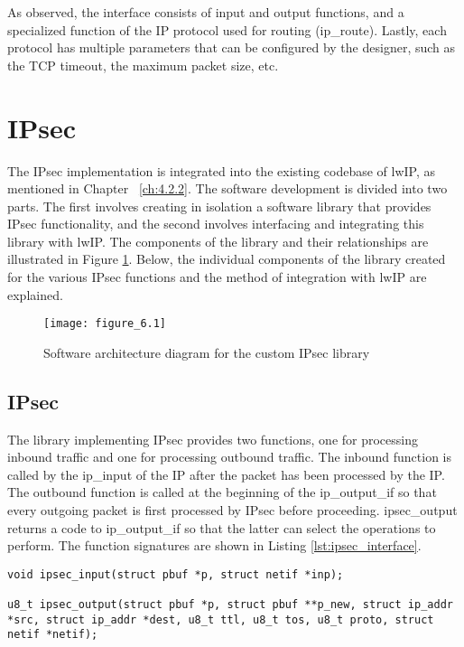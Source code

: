 As observed, the interface consists of input and output functions, and a specialized function of the IP protocol used for routing (ip\_route).
Lastly, each protocol has multiple parameters that can be configured by the designer, such as the TCP timeout, the maximum packet size, etc.

\section{IPsec}
The IPsec implementation is integrated into the existing codebase of lwIP, as mentioned in Chapter ~\ref{ch:4.2.2}. The software development is divided into two parts. The first involves creating in isolation a software library that provides IPsec functionality, and the second involves interfacing and integrating this library with lwIP. The components of the library and their relationships are illustrated in Figure \ref{fig:figure_6.1}. Below, the individual components of the library created for the various IPsec functions and the method of integration with lwIP are explained.


\begin{figure}
\centering
\texttt{[image: figure\_6.1]}\\
\caption{  Software architecture diagram for the custom IPsec library }
\label{fig:figure_6.1}
\end{figure}

\subsection{IPsec}
The library implementing IPsec provides two functions, one for processing inbound traffic and one for processing outbound traffic. The inbound function is called by the ip\_input of the IP after the packet has been processed by the IP. The outbound function is called at the beginning of the ip\_output\_if  so that every outgoing packet is first processed by IPsec before proceeding. ipsec\_output returns a code to ip\_output\_if so that the latter can select the operations to perform. The function signatures are shown in Listing \ref{lst:ipsec_interface}.\\

\noindent
\begin{minipage}{\linewidth}
\begin{lstlisting}[style=mycodestyle, label={lst:ipsec_interface}, caption={IPsec implemented interface}]
void ipsec_input(struct pbuf *p, struct netif *inp);

u8_t ipsec_output(struct pbuf *p, struct pbuf **p_new, struct ip_addr *src, struct ip_addr *dest, u8_t ttl, u8_t tos, u8_t proto, struct netif *netif);
\end{lstlisting}
\end{minipage}\\

